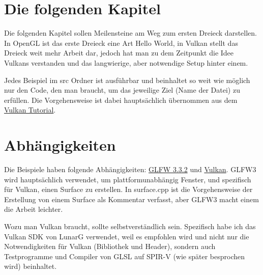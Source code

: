 \documentclass[11pt,a4paper]{report}
\begin{document}
\section{Die folgenden Kapitel}
Die folgenden Kapitel sollen Meilensteine am Weg zum ersten Dreieck darstellen. In OpenGL ist das erste Dreieck eine Art Hello World, in Vulkan stellt das Dreieck weit mehr Arbeit dar, jedoch hat man zu dem Zeitpunkt die Idee Vulkans verstanden und das langwierige, aber notwendige Setup hinter einem.

Jedes Beispiel im src Ordner ist ausführbar und beinhaltet so weit wie möglich nur den Code, den man braucht, um das jeweilige Ziel (Name der Datei) zu erfüllen. Die Vorgehensweise ist dabei hauptsächlich übernommen aus dem \href{https://vulkan-tutorial.com}{Vulkan Tutorial}.

\section{Abhängigkeiten}
Die Beispiele haben folgende Abhängigkeiten: \href{https://www.glfw.org/download.html}{GLFW 3.3.2} und \href{https://vulkan.lunarg.com}{Vulkan}. GLFW3 wird hauptsächlich verwendet, um plattformunabhängig Fenster, und spezifisch für Vulkan, einen Surface zu erstellen. In surface.cpp ist die Vorgehensweise der Erstellung von einem Surface als Kommentar verfasst, aber GLFW3 macht einem die Arbeit leichter.

Wozu man Vulkan braucht, sollte selbstverständlich sein. Spezifisch habe ich das Vulkan SDK von LunarG verwendet, weil es empfohlen wird und nicht nur die Notwendigkeiten für Vulkan (Bibliothek und Header), sondern auch Testprogramme und Compiler von GLSL auf SPIR-V (wie später besprochen wird) beinhaltet.
\end{document}

